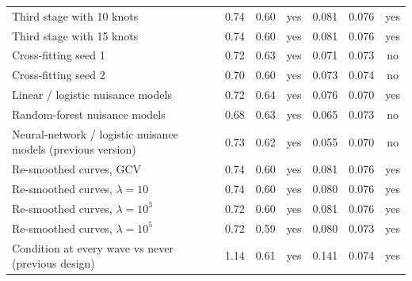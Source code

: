 \begin{tabular}{lcccccc}
Third stage with 10 knots & 0.74 & 0.60 & yes & 0.081 & 0.076 & yes \\
Third stage with 15 knots & 0.74 & 0.60 & yes & 0.081 & 0.076 & yes \\
Cross-fitting seed 1 & 0.72 & 0.63 & yes & 0.071 & 0.073 & no \\
Cross-fitting seed 2 & 0.70 & 0.60 & yes & 0.073 & 0.074 & no \\
Linear / logistic nuisance models & 0.72 & 0.64 & yes & 0.076 & 0.070 & yes \\
Random-forest nuisance models & 0.68 & 0.63 & yes & 0.065 & 0.073 & no \\
Neural-network / logistic nuisance models (previous version) & 0.73 & 0.62 & yes & 0.055 & 0.070 & no \\
Re-smoothed curves, GCV & 0.74 & 0.60 & yes & 0.081 & 0.076 & yes \\
Re-smoothed curves, $\lambda=10$ & 0.74 & 0.60 & yes & 0.080 & 0.076 & yes \\
Re-smoothed curves, $\lambda=10^3$ & 0.72 & 0.60 & yes & 0.081 & 0.076 & yes \\
Re-smoothed curves, $\lambda=10^5$ & 0.72 & 0.59 & yes & 0.080 & 0.073 & yes \\
Condition at every wave vs never (previous design) & 1.14 & 0.61 & yes & 0.141 & 0.074 & yes \\
\bottomrule
\end{tabular}